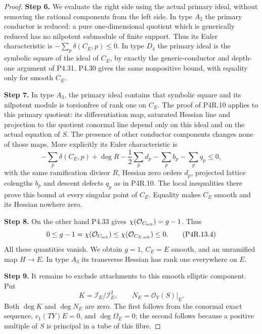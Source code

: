 \begin{proof}
\noindent\textbf{Step 6.} We evaluate the right side using the actual primary
ideal, without removing the rational components from
the left side. In type $A_2$ the primary conductor
is reduced: a pure one-dimensional quotient which
is generically reduced has no nilpotent submodule
of finite support. Thus its Euler characteristic
is $-\sum_p\delta(C_E,p)\le0$. In type $D_4$ the
primary ideal is the symbolic square of the ideal
of $C_E$, by exactly the generic-conductor and
depth-one argument of P4.31. P4.30 gives the same
nonpositive bound, with equality only for smooth
$C_E$.

\noindent\textbf{Step 7.} In type $A_3$, the primary ideal contains that
symbolic square and its nilpotent module is
torsionfree of rank one on $C_E$. The proof of
P4R.10 applies to this primary quotient: its
differentiation map, saturated Hessian line and
projection to the quotient conormal line depend
only on this ideal and on the actual equation of
$S$. The presence of other conductor components
changes none of those maps. More explicitly its
Euler characteristic is
\[
 -\sum_p\delta(C_E,p)+\deg R
 -\frac12\sum_p d_p-\sum_p b_p-\sum_p q_p\le0,
\]
with the same ramification divisor $R$, Hessian
zero orders $d_p$, projected lattice colengths
$b_p$ and descent defects $q_p$ as in P4R.10.
The local inequalities there prove this bound
at every singular point of $C_E$. Equality
makes $C_E$ smooth and its Hessian nowhere zero.

\noindent\textbf{Step 8.} On the other hand P4.33 gives
$\chi(\mathcal O_{C_{\rm sch}})=g-1$. Thus
\[
 0\le g-1
 =\chi(\mathcal O_{C_{\rm sch}})
 \le\chi(\mathcal O_{C_{E,\rm sch}})\le0.                    \tag{P4R.13.4}
\]
All these quantities vanish. We obtain $g=1$,
$C_E=E$ smooth, and an unramified map $H\to E$.
In type $A_3$ its transverse Hessian has rank
one everywhere on $E$.

\noindent\textbf{Step 9.} It remains to exclude attachments to this smooth
elliptic component. Put
\[
 K=\mathcal I_E/\mathcal I_E^2,
 \qquad N_E=\mathcal O_Y(S)|_E.
\]
Both $\deg K$ and $\deg N_E$ are zero. The first
follows from the conormal exact sequence,
$c_1(TY)E=0$, and $\deg\Omega_E=0$; the second
follows because a positive multiple of $S$ is
principal in a tube of this fibre.


\end{proof}
